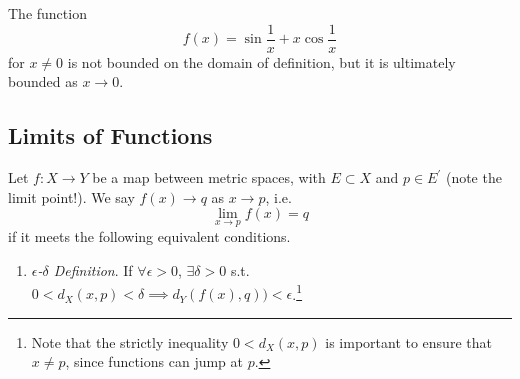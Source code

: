   \begin{example}
    The function 
    \begin{equation}
      f(x) = \sin{\frac{1}{x}} + x \cos{\frac{1}{x}}
    \end{equation}
    for $x \neq 0$ is not bounded on the domain of definition, but it is ultimately bounded as $x \rightarrow 0$. 
  \end{example}

\subsection{Limits of Functions}

  \begin{definition}
    Let $f: X \rightarrow Y$ be a map between metric spaces, with $E \subset X$ and  $p \in E^\prime$ (note the limit point!). We say $f(x) \rightarrow q$ as $x \rightarrow p$, i.e. 
    \begin{equation}
      \lim_{x \rightarrow p} f(x) = q
    \end{equation} 
    if it meets the following equivalent conditions. 
    \begin{enumerate}
      \item \textit{$\epsilon$-$\delta$ Definition}. If $\forall \epsilon > 0$, $\exists \delta > 0$ s.t. $0 < d_X (x, p) < \delta \implies d_Y (f(x), q)) < \epsilon$.\footnote{Note that the strictly inequality $0 < d_X (x, p)$ is important to ensure that $x \neq p$, since functions can jump at $p$.} 

      \begin{figure}[H]
        \centering 
\end{figure}
\end{enumerate}
\end{definition}
